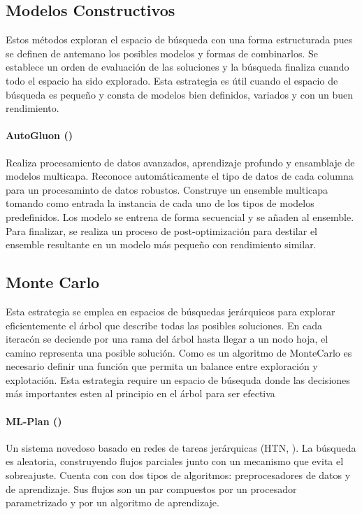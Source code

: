 
\subsection{Modelos Constructivos}
Estos m\'etodos exploran el espacio de b\'usqueda con una forma estructurada pues se definen de antemano los posibles modelos y formas de combinarlos. Se establece un orden de evaluaci\'on de las soluciones y la b\'usqueda finaliza cuando todo el espacio ha sido explorado. Esta estrategia es \'util cuando el espacio de b\'usqueda es peque\~no y consta de modelos bien definidos, variados y con un buen rendimiento.

\paragraph{AutoGluon (\cite{erickson2020autogluon})} Realiza procesamiento de datos avanzados, aprendizaje profundo y ensamblaje de modelos multicapa. Reconoce autom\'aticamente el tipo de datos de cada columna para un procesaminto de datos robustos. Construye un ensemble multicapa  tomando como entrada la instancia de cada uno de los tipos de modelos predefinidos. Los modelo se entrena de forma secuencial y se a\~naden al ensemble. Para finalizar, se realiza un proceso de post-optimizaci\'on para destilar el ensemble resultante en un modelo m\'as peque\~no con rendimiento similar.

\subsection{Monte Carlo}
 Esta estrategia se emplea en espacios de b\'usquedas jer\'arquicos para explorar eficientemente el \'arbol que describe todas las  posibles soluciones. En cada iterac\'on se deciende por una rama del \'arbol hasta llegar a un nodo hoja, el camino representa una posible soluci\'on. Como es un algoritmo de MonteCarlo es necesario definir una funci\'on que permita un balance entre exploraci\'on y explotaci\'on. Esta estrategia require un espacio de b\'usequda donde las decisiones m\'as importantes esten al principio en el \'arbol para ser efectiva

 \paragraph{ML-Plan (\cite{mohr2018ml})} Un sistema novedoso basado en redes de tareas jer\'arquicas (HTN, \cite{erol1994umcp}). La b\'usqueda es aleatoria, construyendo flujos parciales junto con un mecanismo que evita el sobreajuste. Cuenta con con dos tipos de algoritmos:  preprocesadores de datos y de aprendizaje. Sus flujos son un par compuestos por un procesador parametrizado y por un algoritmo de aprendizaje.
    


